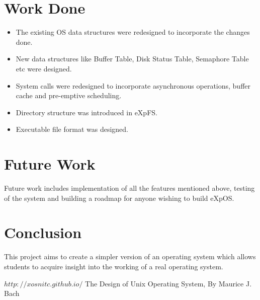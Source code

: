 \documentclass[10pt]{article}
\begin{document}
\section{Work Done}
\begin {itemize}
\item The existing OS data structures were redesigned to incorporate the changes done. 
\item New data structures like Buffer Table, Disk Status Table, Semaphore Table etc were designed.
\item System calls were redesigned to incorporate asynchronous operations, buffer cache and pre-emptive scheduling.
\item Directory structure was introduced in eXpFS.
\item Executable file format was designed.
\end{itemize}
 
\section{Future Work}
Future work includes implementation of all the features mentioned above, testing of the system and building a roadmap for anyone wishing to build eXpOS.
\section{Conclusion}
This project aims to create a simpler version of an operating system which allows students to acquire insight into the working of a real operating system. 

\begin{thebibliography}{1}
\texttt{$http://xosnitc.github.io/$}
 The Design of Unix Operating System, By Maurice J. Bach
\end{thebibliography}
\end{document}
